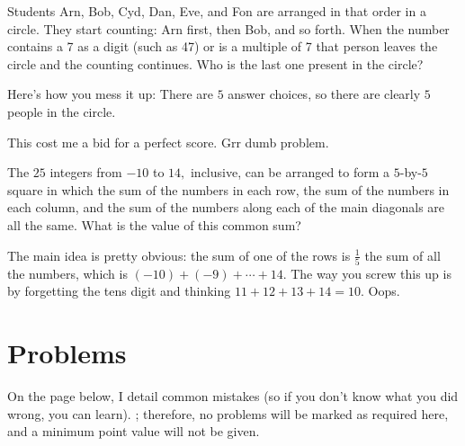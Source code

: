 \documentclass[blue,onecol]{shooting}
\begin{document}
\begin{exam}[AMC 8 2018/3]
Students Arn, Bob, Cyd, Dan, Eve, and Fon are arranged in that order in a circle. They start counting: Arn first, then Bob, and so forth. When the number contains a 7 as a digit (such as 47) or is a multiple of 7 that person leaves the circle and the counting continues. Who is the last one present in the circle?
\end{exam}

Here's how you mess it up: There are $5$ answer choices, so there are clearly $5$ people in the circle.

This cost me a bid for a perfect score. Grr dumb problem.

\begin{exam}[AMC 10A 2020/7]
The $25$ integers from $-10$ to $14,$ inclusive, can be arranged to form a $5$-by-$5$ square in which the sum of the numbers in each row, the sum of the numbers in each column, and the sum of the numbers along each of the main diagonals are all the same. What is the value of this common sum?
\end{exam}

The main idea is pretty obvious: the sum of one of the rows is $\frac{1}{5}$ the sum of all the numbers, which is $(-10)+(-9)+\cdots+14.$ The way you screw this up is by forgetting the tens digit and thinking $11+12+13+14=10.$ Oops.

\pagebreak

\section{Problems}

On the page below, I detail common mistakes (so if you don't know what you did wrong, you can learn). ; therefore, no problems will be marked as required here, and a minimum point value will not be given.



\end{document}
